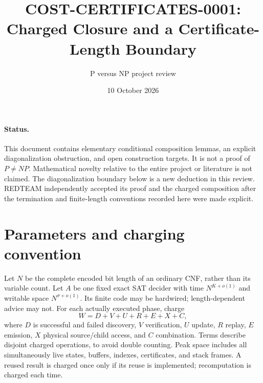 \documentclass[11pt]{article}
\title{COST-CERTIFICATES-0001: Charged Closure and a Certificate-Length Boundary}
\author{P versus NP project review}
\date{10 October 2026}
\begin{document}
\maketitle
\paragraph{Status.} This document contains elementary conditional composition
lemmas, an explicit diagonalization obstruction, and open construction targets.
It is not a proof of $P\ne NP$. Mathematical novelty relative to the entire
project or literature is not claimed. The diagonalization boundary below is a
new deduction in this review. REDTEAM independently accepted its proof and
the charged composition after the termination and finite-length conventions
recorded here were made explicit.

\section{Parameters and charging convention}
Let $N$ be the complete encoded bit length of an ordinary CNF, rather than its
variable count. Let $A$ be one fixed exact SAT decider with time $N^{K+o(1)}$
and writable space $N^{\sigma+o(1)}$. Its finite code may be hardwired;
length-dependent advice may not. For each actually executed phase, charge
\[
 W=D+V+U+R+E+X+C,
\]
where $D$ is successful and failed discovery, $V$ verification, $U$ update,
$R$ replay, $E$ emission, $X$ physical source/child access, and $C$ combination.
Terms describe disjoint charged operations, to avoid double counting.
Peak space includes all simultaneously live states, buffers, indexes,
certificates, and stack frames. A reused result is charged once only if its
reuse is implemented; recomputation is charged each time.
\end{document}
